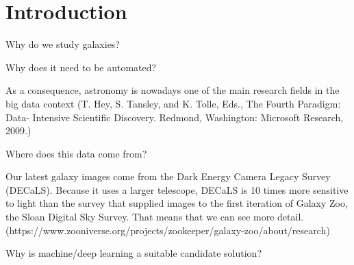 \section{Introduction}

Why do we study galaxies?

Why does it need to be automated?

As a consequence, astronomy is nowadays one of the main research fields in the big data context (T. Hey, S. Tansley, and K. Tolle, Eds., The Fourth Paradigm: Data- Intensive Scientific Discovery. Redmond, Washington: Microsoft Research, 2009.)

Where does this data come from?

Our latest galaxy images come from the Dark Energy Camera Legacy Survey (DECaLS). Because it uses a larger telescope, DECaLS is 10 times more sensitive to light than the survey that supplied images to the first iteration of Galaxy Zoo, the Sloan Digital Sky Survey. That means that we can see more detail. (https://www.zooniverse.org/projects/zookeeper/galaxy-zoo/about/research)

Why is machine/deep learning a suitable candidate solution?
